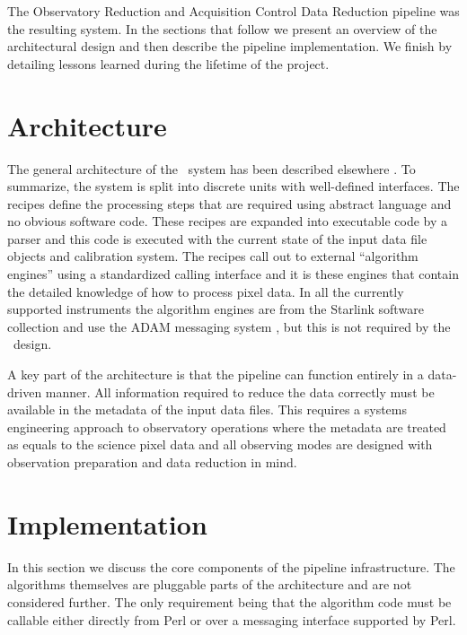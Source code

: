 \documentclass[final,authoryear,5p,times,twocolumn]{elsarticle}
\begin{document}
The Observatory Reduction and Acquisition Control Data Reduction pipeline
\citep[\oracdr;][]{1999ASPC..172...11E,2008AN....329..295C} was
the resulting system. In the sections that follow we present an
overview of the architectural design and then describe the pipeline
implementation. We finish by detailing lessons learned during the
lifetime of the project.

\section{Architecture}

The general architecture of the \oracdr\ system has been described
elsewhere \citep{1999ASPC..172...11E,2008AN....329..295C}. To
summarize, the system is split into discrete units with well-defined
interfaces. The recipes define the processing steps that are required
using abstract language and no obvious software code. These recipes
are expanded into executable code by a parser and this code is
executed with the current state of the input data file objects and
calibration system. The recipes call out to external ``algorithm
engines'' using a standardized calling interface and it is these
engines that contain the detailed knowledge of how to process pixel
data.  In all the currently supported instruments the algorithm
engines are from the Starlink software collection
\citep[][]{2014ASPC..485..391C} and use the ADAM
messaging system \citep{1992ASPC...25..126A}, but this is not
required by the \oracdr\ design.

A key part of the architecture is that the pipeline can function
entirely in a data-driven manner. All information required to reduce
the data correctly must be available in the metadata of the input data
files. This requires a systems engineering approach to observatory
operations where the metadata are treated as equals to the science
pixel data \citep[see e.g.,][for an overview of the JCMT and UKIRT
approach]{2011tfa..confE..42J} and all observing modes are designed
with observation preparation and data reduction in mind.

\section{Implementation}

In this section we discuss the core components of the pipeline
infrastructure. The algorithms themselves are pluggable parts of the
architecture and are not considered further. The only requirement
being that the algorithm code must be callable either directly from
Perl or over a messaging interface supported by Perl.
\end{document}
